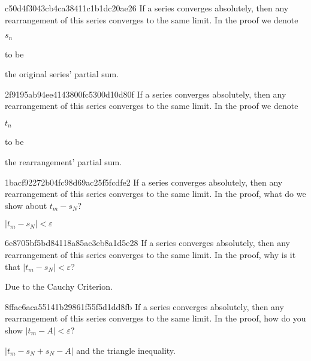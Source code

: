 \begin{note}{c50d4f3043cb4ca38411c1b1dc20ae26}
    If a series converges absolutely, then any rearrangement of this series converges to the same limit.
    In the proof we denote \begin{icloze}{2}\({ s_n }\)\end{icloze} to be \begin{icloze}{1}the original series' partial sum.\end{icloze}
\end{note}

\begin{note}{2f9195ab94ee4143800fc5300d10d80f}
    If a series converges absolutely, then any rearrangement of this series converges to the same limit.
    In the proof we denote \begin{icloze}{2}\({ t_n }\)\end{icloze} to be \begin{icloze}{1}the rearrangement' partial sum.\end{icloze}
\end{note}

\begin{note}{1bacf92272b04fc98d69ac25f5fcdfe2}
    If a series converges absolutely, then any rearrangement of this series converges to the same limit.
    In the proof, what do we show about \({ t_m - s_N }\)?

    \begin{cloze}{1}
        \({ \left\lvert t_m - s_N \right\rvert < \varepsilon }\)
    \end{cloze}
\end{note}

\begin{note}{6e8705bf5bd84118a85ac3eb8a1d5e28}
    If a series converges absolutely, then any rearrangement of this series converges to the same limit.
    In the proof, why is it that \({ \left\lvert t_m - s_N \right\rvert < \varepsilon }\)?

    \begin{cloze}{1}
        Due to the Cauchy Criterion.
    \end{cloze}
\end{note}

\begin{note}{8ffac6aca55141b29861f55f5d1dd8fb}
    If a series converges absolutely, then any rearrangement of this series converges to the same limit.
    In the proof, how do you show \({ \left\lvert t_m - A \right\rvert < \varepsilon }\)?

    \begin{cloze}{1}
        \({ \left\lvert t_m - s_N + s_N - A \right\rvert }\) and the triangle inequality.
    \end{cloze}
\end{note}

